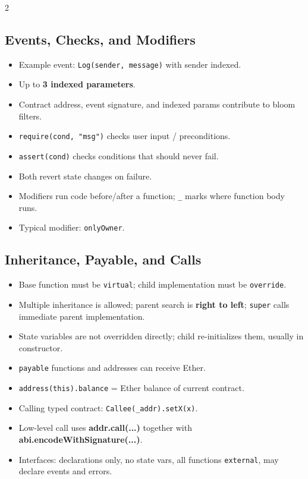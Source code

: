\documentclass[10pt,a4paper]{article}
\newcommand{\term}[1]{\textbf{#1}}
\newcommand{\code}[1]{\texttt{#1}}
\newcommand{\imp}[1]{\textbf{#1}}
\begin{document}
\begin{multicols*}{2}
\subsection*{Events, Checks, and Modifiers}
\begin{itemize}
\item Example event: \code{Log(sender, message)} with sender indexed.
\item Up to \imp{3 indexed parameters}.
\item Contract address, event signature, and indexed params contribute to bloom filters.
\item \code{require(cond, "msg")} checks user input / preconditions.
\item \code{assert(cond)} checks conditions that should never fail.
\item Both revert state changes on failure.
\item Modifiers run code before/after a function; \code{\_} marks where function body runs.
\item Typical modifier: \code{onlyOwner}.
\end{itemize}

\subsection*{Inheritance, Payable, and Calls}
\begin{itemize}
\item Base function must be \code{virtual}; child implementation must be \code{override}.
\item Multiple inheritance is allowed; parent search is \imp{right to left}; \code{super} calls immediate parent implementation.
\item State variables are not overridden directly; child re-initializes them, usually in constructor.
\item \code{payable} functions and addresses can receive Ether.
\item \code{address(this).balance} = Ether balance of current contract.
\item Calling typed contract:
\code{Callee(_addr).setX(x)}.
\item Low-level call uses \term{addr.call(...)} together with \term{abi.encodeWithSignature(...)}.
\item Interfaces: declarations only, no state vars, all functions \code{external}, may declare events and errors.
\end{itemize}


\end{multicols*}
\end{document}
